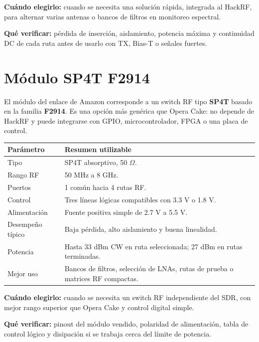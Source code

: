 \documentclass[11pt]{article}
\begin{document}
\textbf{Cuándo elegirlo:} cuando se necesita una solución rápida, integrada al HackRF, para alternar varias antenas o bancos de filtros en monitoreo espectral.

\textbf{Qué verificar:} pérdida de inserción, aislamiento, potencia máxima y continuidad DC de cada ruta antes de usarlo con TX, Bias-T o señales fuertes.

\section{Módulo SP4T F2914}

El módulo del enlace de Amazon corresponde a un switch RF tipo \textbf{SP4T} basado en la familia \textbf{F2914}. Es una opción más genérica que Opera Cake: no depende de HackRF y puede integrarse con GPIO, microcontrolador, FPGA o una placa de control.

\begin{table}[h]
    \centering
    \small
    \begin{tabular}{p{}p{}}
        \toprule
        \textbf{Parámetro} & \textbf{Resumen utilizable} \\
        \midrule
        Tipo & SP4T absorptivo, 50 $\Omega$. \\
        Rango RF & 50 MHz a 8 GHz. \\
        Puertos & 1 común hacia 4 rutas RF. \\
        Control & Tres líneas lógicas compatibles con 3.3 V o 1.8 V. \\
        Alimentación & Fuente positiva simple de 2.7 V a 5.5 V. \\
        Desempeño típico & Baja pérdida, alto aislamiento y buena linealidad. \\
        Potencia & Hasta 33 dBm CW en ruta seleccionada; 27 dBm en rutas terminadas. \\
        Mejor uso & Bancos de filtros, selección de LNAs, rutas de prueba o matrices RF compactas. \\
        \bottomrule
    \end{tabular}
\end{table}

\textbf{Cuándo elegirlo:} cuando se necesita un switch RF independiente del SDR, con mejor rango superior que Opera Cake y control digital simple.

\textbf{Qué verificar:} pinout del módulo vendido, polaridad de alimentación, tabla de control lógico y disipación si se trabaja cerca del límite de potencia.
\end{document}
